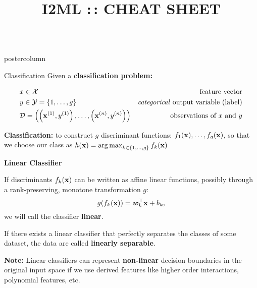 \documentclass{beamer}
\title{I2ML :\,: CHEAT SHEET} %
\newlength{\columnheight} %
\begin{document}
\begin{frame}[fragile]{}
\begin{columns}
	\begin{column}{.31\textwidth}
    \begin{beamercolorbox}[center]{postercolumn}
    
    \begin{minipage}{.98\textwidth}
  \parbox[t][\columnheight]{\textwidth}{
    \begin{myblock}{Classification}
						Given a \textbf{classification problem:}

						\begin{eqnarray*} 
              & x \in \Xspace \quad & \text{feature vector}\\ 
              & y \in \Yspace = \gset \quad & \text{\emph{categorical} output variable (label)}\\ 
              & \D = \Dset & \text{observations of $x$ and $y$} 
            \end{eqnarray*}
						
						\vspace*{1ex}
						
						\textbf{Classification:} to construct $g$ discriminant functions: $f_1(\xv), \ldots, f_g(\xv)$, 
            so that we choose our class as $h(\xv) = \argmax_{k \in \gset} \fkx[k]$
						
						\begin{codebox}
							\textbf{Linear Classifier}
						\end{codebox}
						If discriminants $\fkx$ can be written as affine linear functions, 
            possibly through a rank-preserving, monotone transformation $g$:
            $$g(\fkx) = \bm{w}_k^\top \xv + b_k,$$
            we will call the classifier \textbf{linear}.

            \vspace*{1ex}
            
            If there exists a linear classifier that perfectly separates the classes of some dataset, the data are called \textbf{linearly separable}.
						
            \vspace*{1ex}

            \textbf{Note: }Linear classifiers can represent \textbf{non-linear} decision boundaries in the original input space if we use derived features like higher order interactions, polynomial features, etc.

			    \vspace*{1ex}
			

\end{myblock}}
\end{minipage}
\end{beamercolorbox}
\end{column}
\end{columns}
\end{frame}
\end{document}
